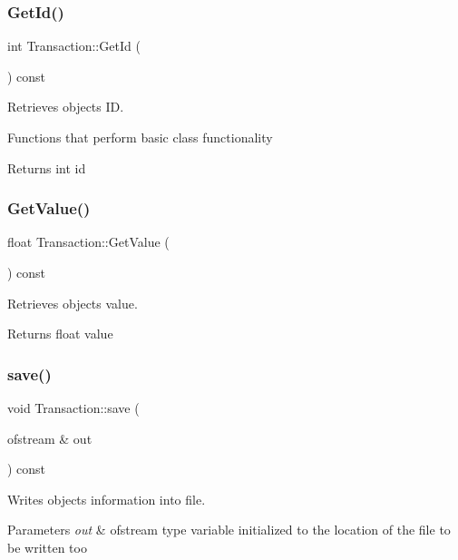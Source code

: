 \subsubsection{\texorpdfstring{Get\+Id()}{GetId()}}
{\footnotesize\ttfamily int Transaction\+::\+Get\+Id (\begin{DoxyParamCaption}{ }\end{DoxyParamCaption}) const}



Retrieves object\textquotesingle{}s ID. 

Functions that perform basic class functionality \begin{DoxyReturn}{Returns}
int id 
\end{DoxyReturn}
\mbox{\label{group___transaction_ga3dca9a51e64e6fcb07f501eb2724676d}} 
\subsubsection{\texorpdfstring{Get\+Value()}{GetValue()}}
{\footnotesize\ttfamily float Transaction\+::\+Get\+Value (\begin{DoxyParamCaption}{ }\end{DoxyParamCaption}) const}



Retrieves object\textquotesingle{}s value. 

\begin{DoxyReturn}{Returns}
float value 
\end{DoxyReturn}
\mbox{\label{group___transaction_ga56b1bd622e55266bf795fb01e04e8a21}} 
\subsubsection{\texorpdfstring{save()}{save()}}
{\footnotesize\ttfamily void Transaction\+::save (\begin{DoxyParamCaption}\item[{ofstream \&}]{out }\end{DoxyParamCaption}) const}



Writes object\textquotesingle{}s information into file. 


\begin{DoxyParams}{Parameters}
{\em out} & ofstream type variable initialized to the location of the file to be written too \\
\hline
\end{DoxyParams}
\mbox{\label{group___transaction_ga6bba02c02aace16e90745fecd2e4697d}} 
